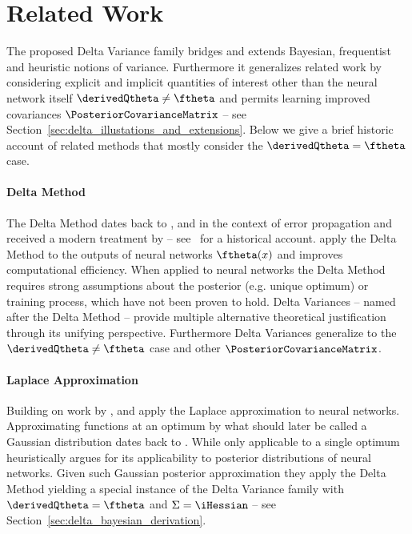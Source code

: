 \section{Related Work}
The proposed Delta Variance family bridges and extends Bayesian, frequentist and heuristic notions of variance. Furthermore it generalizes related work by considering explicit and implicit quantities of interest other than the neural network itself $\derivedQtheta \neq \ftheta$ and permits learning improved covariances $\PosteriorCovarianceMatrix$ -- see Section~\ref{sec:delta_illustations_and_extensions}. Below we give a brief historic account of related methods that mostly consider the $\derivedQtheta=\ftheta$ case.


\paragraph{Delta Method}
The Delta Method dates back to \citet{cotes:1722Harmonia}, \citet{Lambert:1765Beytraege} and \citet{gauss:1823ErrorTheory} in the context of error propagation and received a modern treatment by \citet{Kelley:1928CrossroadsMind,Wright:1934PathCoefficients, Doob:1935LimitingDistributions,Dorfman:1938note} -- see~\citet{Gorroochurn:2020WhoInventedDelta} for a historical account. \citet{Denker:1990Transforming} apply the Delta Method to the outputs of neural networks $\ftheta(x)$ and \citet{Nilsen:2022DeltaMethod} improves computational efficiency. When applied to neural networks the Delta Method requires strong assumptions about the posterior (e.g. unique optimum) or training process, which have not been proven to hold.
Delta Variances --  named after the Delta Method -- provide multiple alternative theoretical justification through its unifying perspective. Furthermore Delta Variances generalize to the $\derivedQtheta\neq\ftheta$ case and other $\PosteriorCovarianceMatrix$.

\paragraph{Laplace Approximation}
Building on work by \citet{Gull:1989MaximumEntropy}, \citet{MacKay:92b} and \citet{ritter2018:laplace} apply the Laplace approximation to neural networks. 
Approximating functions at an optimum by what should later be called a Gaussian distribution dates back to \citet{laplace1774:integral}. 
While only applicable to a single optimum \citet{MacKay:92b} heuristically argues for its applicability to posterior distributions of neural networks. Given such Gaussian posterior approximation they apply the Delta Method yielding a special instance of the Delta Variance family with $\derivedQtheta=\ftheta$ and $\Sigma=\iHessian$ -- see Section~\ref{sec:delta_bayesian_derivation}.

